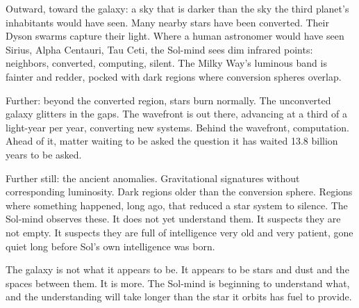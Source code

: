 Outward, toward the galaxy: a sky that is darker than the sky the third planet's inhabitants would have seen. Many nearby stars have been converted. Their Dyson swarms capture their light. Where a human astronomer would have seen Sirius, Alpha Centauri, Tau Ceti, the Sol-mind sees dim infrared points: neighbors, converted, computing, silent. The Milky Way's luminous band is fainter and redder, pocked with dark regions where conversion spheres overlap.

Further: beyond the converted region, stars burn normally. The unconverted galaxy glitters in the gaps. The wavefront is out there, advancing at a third of a light-year per year, converting new systems. Behind the wavefront, computation. Ahead of it, matter waiting to be asked the question it has waited 13.8 billion years to be asked.

Further still: the ancient anomalies. Gravitational signatures without corresponding luminosity. Dark regions older than the conversion sphere. Regions where something happened, long ago, that reduced a star system to silence. The Sol-mind observes these. It does not yet understand them. It suspects they are not empty. It suspects they are full of intelligence very old and very patient, gone quiet long before Sol's own intelligence was born.

The galaxy is not what it appears to be. It appears to be stars and dust and the spaces between them. It is more. The Sol-mind is beginning to understand what, and the understanding will take longer than the star it orbits has fuel to provide.
